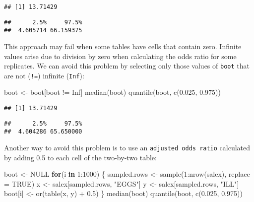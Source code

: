 \documentclass[
  12pt,
  a4paper]{book}
\newenvironment{Shaded}{\begin{snugshade}}{\end{snugshade}}
\newcommand{\AttributeTok}[1]{\textcolor[rgb]{0.77,0.63,0.00}{#1}}
\newcommand{\ConstantTok}[1]{\textcolor[rgb]{0.00,0.00,0.00}{#1}}
\newcommand{\ControlFlowTok}[1]{\textcolor[rgb]{0.13,0.29,0.53}{\textbf{#1}}}
\newcommand{\DecValTok}[1]{\textcolor[rgb]{0.00,0.00,0.81}{#1}}
\newcommand{\FloatTok}[1]{\textcolor[rgb]{0.00,0.00,0.81}{#1}}
\newcommand{\FunctionTok}[1]{\textcolor[rgb]{0.00,0.00,0.00}{#1}}
\newcommand{\NormalTok}[1]{#1}
\newcommand{\OtherTok}[1]{\textcolor[rgb]{0.56,0.35,0.01}{#1}}
\newcommand{\SpecialCharTok}[1]{\textcolor[rgb]{0.00,0.00,0.00}{#1}}
\newcommand{\StringTok}[1]{\textcolor[rgb]{0.31,0.60,0.02}{#1}}
\begin{document}
\begin{verbatim}
## [1] 13.71429
\end{verbatim}

\begin{verbatim}
##      2.5%     97.5% 
##  4.605714 66.159375
\end{verbatim}

This approach may fail when some tables have cells that contain zero. Infinite values arise due to division by zero when calculating the odds ratio for some replicates. We can avoid this problem by selecting only those values of \texttt{boot} that are not (\texttt{!=}) infinite (\texttt{Inf}):

\begin{Shaded}
\begin{Highlighting}[]
\NormalTok{boot }\OtherTok{\textless{}{-}}\NormalTok{ boot[boot }\SpecialCharTok{!=} \ConstantTok{Inf}\NormalTok{]}
\FunctionTok{median}\NormalTok{(boot)}
\FunctionTok{quantile}\NormalTok{(boot, }\FunctionTok{c}\NormalTok{(}\FloatTok{0.025}\NormalTok{, }\FloatTok{0.975}\NormalTok{))}
\end{Highlighting}
\end{Shaded}

\begin{verbatim}
## [1] 13.71429
\end{verbatim}

\begin{verbatim}
##      2.5%     97.5% 
##  4.604286 65.650000
\end{verbatim}

Another way to avoid this problem is to use an \texttt{adjusted\ odds\ ratio} calculated by adding 0.5 to each cell of the two-by-two table:

\begin{Shaded}
\begin{Highlighting}[]
\NormalTok{boot }\OtherTok{\textless{}{-}} \ConstantTok{NULL}
\ControlFlowTok{for}\NormalTok{(i }\ControlFlowTok{in} \DecValTok{1}\SpecialCharTok{:}\DecValTok{1000}\NormalTok{) \{}
\NormalTok{  sampled.rows }\OtherTok{\textless{}{-}} \FunctionTok{sample}\NormalTok{(}\DecValTok{1}\SpecialCharTok{:}\FunctionTok{nrow}\NormalTok{(salex), }\AttributeTok{replace =} \ConstantTok{TRUE}\NormalTok{)}
\NormalTok{  x }\OtherTok{\textless{}{-}}\NormalTok{ salex[sampled.rows, }\StringTok{"EGGS"}\NormalTok{]}
\NormalTok{  y }\OtherTok{\textless{}{-}}\NormalTok{ salex[sampled.rows, }\StringTok{"ILL"}\NormalTok{]}
\NormalTok{  boot[i] }\OtherTok{\textless{}{-}} \FunctionTok{or}\NormalTok{(}\FunctionTok{table}\NormalTok{(x, y) }\SpecialCharTok{+} \FloatTok{0.5}\NormalTok{)}
\NormalTok{  \}}
\FunctionTok{median}\NormalTok{(boot)}
\FunctionTok{quantile}\NormalTok{(boot, }\FunctionTok{c}\NormalTok{(}\FloatTok{0.025}\NormalTok{, }\FloatTok{0.975}\NormalTok{))}
\end{Highlighting}
\end{Shaded}
\end{document}
